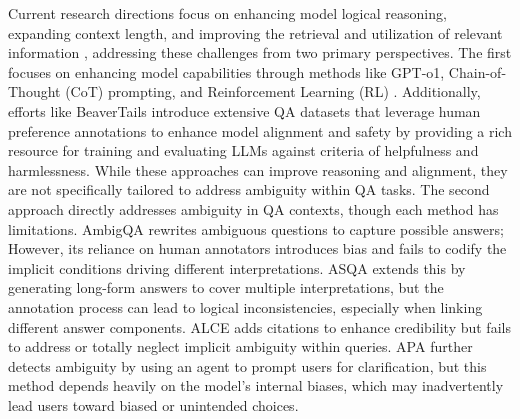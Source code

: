 Current research directions focus on enhancing model logical reasoning, expanding context length, and improving the retrieval and utilization of relevant information \cite{ding2024longrope,sun2024determlr,petroni2024ir}, addressing these challenges from two primary perspectives. The first focuses on enhancing model capabilities through methods like GPT-o1, Chain-of-Thought (CoT) prompting, and Reinforcement Learning (RL) \cite{wei2022chain,ahmadian2024back}. Additionally, efforts like BeaverTails \cite{ji2024beavertails} introduce extensive QA datasets that leverage human preference annotations to enhance model alignment and safety by providing a rich resource for training and evaluating LLMs against criteria of helpfulness and harmlessness. While these approaches can improve reasoning and alignment, they are not specifically tailored to address ambiguity within QA tasks. The second approach directly addresses ambiguity in QA contexts, though each method has limitations. AmbigQA \cite{min-etal-2020-ambigqa} rewrites ambiguous questions to capture possible answers; However, its reliance on human annotators introduces bias and fails to codify the implicit conditions driving different interpretations. %
ASQA \cite{stelmakh-etal-2022-asqa} extends this by generating long-form answers to cover multiple interpretations, but the annotation process can lead to logical inconsistencies, especially when linking different answer components. ALCE \cite{gao-etal-2023-enabling} adds citations to enhance credibility but fails to address or totally neglect implicit ambiguity within queries. APA \cite{kim2024aligning} further detects ambiguity by using an agent to prompt users for clarification, but this method depends heavily on the model’s internal biases, which may inadvertently lead users toward biased or unintended choices.


